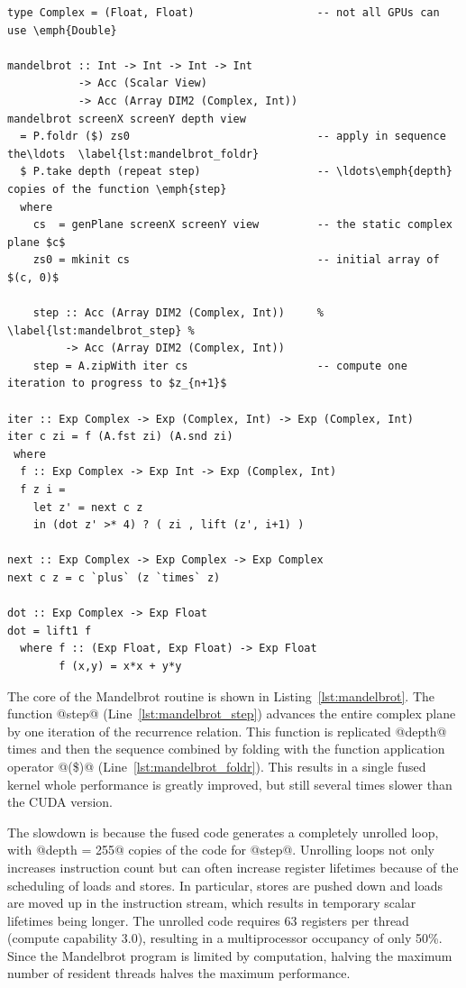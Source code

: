 \begin{lstlisting}[style=haskell
    ,float=tbh
    ,label=lst:mandelbrot
    ,caption={Mandelbrot set generator in Accelerate}]
type Complex = (Float, Float)                   -- not all GPUs can use \emph{Double}

mandelbrot :: Int -> Int -> Int -> Int
           -> Acc (Scalar View)
           -> Acc (Array DIM2 (Complex, Int))
mandelbrot screenX screenY depth view
  = P.foldr ($) zs0                             -- apply in sequence the\ldots  \label{lst:mandelbrot_foldr}
  $ P.take depth (repeat step)                  -- \ldots\emph{depth} copies of the function \emph{step}
  where
    cs  = genPlane screenX screenY view         -- the static complex plane $c$
    zs0 = mkinit cs                             -- initial array of $(c, 0)$

    step :: Acc (Array DIM2 (Complex, Int))     % \label{lst:mandelbrot_step} %
         -> Acc (Array DIM2 (Complex, Int))
    step = A.zipWith iter cs                    -- compute one iteration to progress to $z_{n+1}$

iter :: Exp Complex -> Exp (Complex, Int) -> Exp (Complex, Int)
iter c zi = f (A.fst zi) (A.snd zi)
 where
  f :: Exp Complex -> Exp Int -> Exp (Complex, Int)
  f z i =
    let z' = next c z
    in (dot z' >* 4) ? ( zi , lift (z', i+1) )

next :: Exp Complex -> Exp Complex -> Exp Complex
next c z = c `plus` (z `times` z)

dot :: Exp Complex -> Exp Float
dot = lift1 f
  where f :: (Exp Float, Exp Float) -> Exp Float
        f (x,y) = x*x + y*y
\end{lstlisting}

The core of the Mandelbrot routine is shown in Listing~\ref{lst:mandelbrot}. The
function @step@ (Line~\ref{lst:mandelbrot_step}) advances the entire
complex plane by one iteration of the recurrence relation. This function is
replicated @depth@ times and then the sequence combined by folding with the
function application operator @(\$)@ (Line~\ref{lst:mandelbrot_foldr}). This
results in a single fused kernel whole performance is greatly improved, but
still several times slower than the CUDA version.

The slowdown is because the fused code generates a completely unrolled loop,
with @depth = 255@ copies of the code for @step@. Unrolling loops not
only increases instruction count but can often increase register lifetimes
because of the scheduling of loads and stores. In particular, stores are pushed
down and loads are moved up in the instruction stream, which results in
temporary scalar lifetimes being longer. The unrolled code requires 63 registers
per thread (compute capability 3.0), resulting in a multiprocessor occupancy of
only 50\%. Since the Mandelbrot program is limited by computation, halving the
maximum number of resident threads halves the maximum performance.

